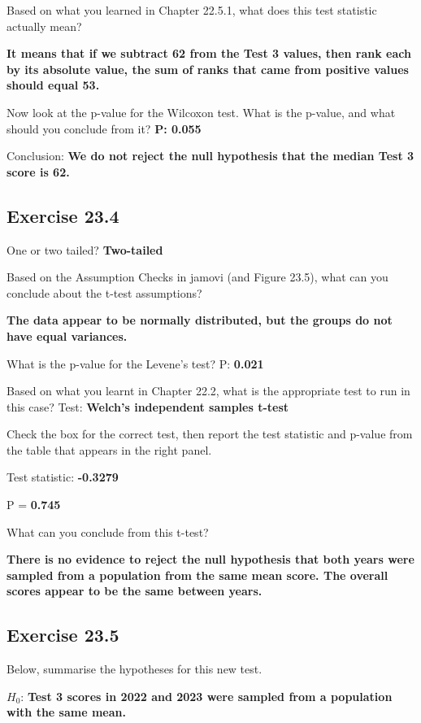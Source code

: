 \documentclass[
]{scrbook}
\begin{document}
Based on what you learned in Chapter 22.5.1, what does this test statistic actually mean?

\textbf{It means that if we subtract 62 from the Test 3 values, then rank each by its absolute value, the sum of ranks that came from positive values should equal 53.}

Now look at the p-value for the Wilcoxon test. What is the p-value, and what
should you conclude from it? \textbf{P: 0.055}

Conclusion: \textbf{We do not reject the null hypothesis that the median Test 3 score is 62.}

\hypertarget{exercise-23.4}{%
\subsection{Exercise 23.4}\label{exercise-23.4}}

One or two tailed? \textbf{Two-tailed}

Based on the Assumption Checks in jamovi (and Figure 23.5), what can you conclude about the t-test assumptions?

\textbf{The data appear to be normally distributed, but the groups do not have equal variances.}

What is the p-value for the Levene's test? P: \textbf{0.021}

Based on what you learnt in Chapter 22.2, what is the appropriate test to run in this case? Test: \textbf{Welch's independent samples t-test}

Check the box for the correct test, then report the test statistic and p-value from the table that appears in the right panel.

Test statistic: \textbf{-0.3279}

P = \textbf{0.745}

What can you conclude from this t-test?

\textbf{There is no evidence to reject the null hypothesis that both years were sampled from a population from the same mean score. The overall scores appear to be the same between years.}

\hypertarget{exercise-23.5}{%
\subsection{Exercise 23.5}\label{exercise-23.5}}

Below, summarise the hypotheses for this new test.

\(H_{0}\): \textbf{Test 3 scores in 2022 and 2023 were sampled from a population with the same mean.}
\end{document}
